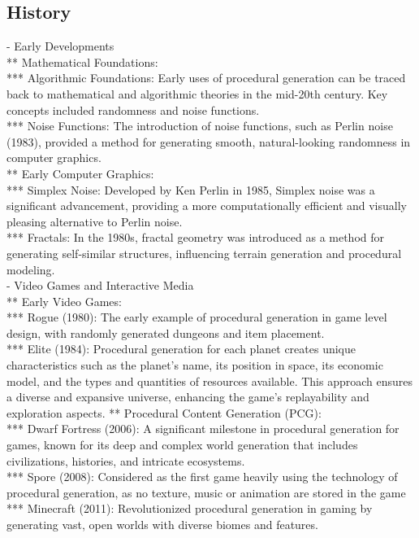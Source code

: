 \subsection{History}
- Early Developments \\
** Mathematical Foundations: \\
*** Algorithmic Foundations: Early uses of procedural generation can be traced back to mathematical and algorithmic theories in the mid-20th century. Key concepts included randomness and noise functions. \\
*** Noise Functions: The introduction of noise functions, such as Perlin noise (1983), provided a method for generating smooth, natural-looking randomness in computer graphics. \\
** Early Computer Graphics: \\
*** Simplex Noise: Developed by Ken Perlin in 1985, Simplex noise was a significant advancement, providing a more computationally efficient and visually pleasing alternative to Perlin noise. \\
*** Fractals: In the 1980s, fractal geometry was introduced as a method for generating self-similar structures, influencing terrain generation and procedural modeling. \\
- Video Games and Interactive Media \\
** Early Video Games: \\
*** Rogue (1980): The early example of procedural generation in game level design, with randomly generated dungeons and item placement. \\
*** Elite (1984): Procedural generation for each planet creates unique characteristics such as the planet's name, its position in space, its economic model, and the types and quantities of resources available. This approach ensures a diverse and expansive universe, enhancing the game's replayability and exploration aspects.
** Procedural Content Generation (PCG): \\
*** Dwarf Fortress (2006): A significant milestone in procedural generation for games, known for its deep and complex world generation that includes civilizations, histories, and intricate ecosystems. \\
*** Spore (2008): Considered as the first game heavily using the technology of procedural generation, as no texture, music or animation are stored in the game \\
*** Minecraft (2011): Revolutionized procedural generation in gaming by generating vast, open worlds with diverse biomes and features. \\

